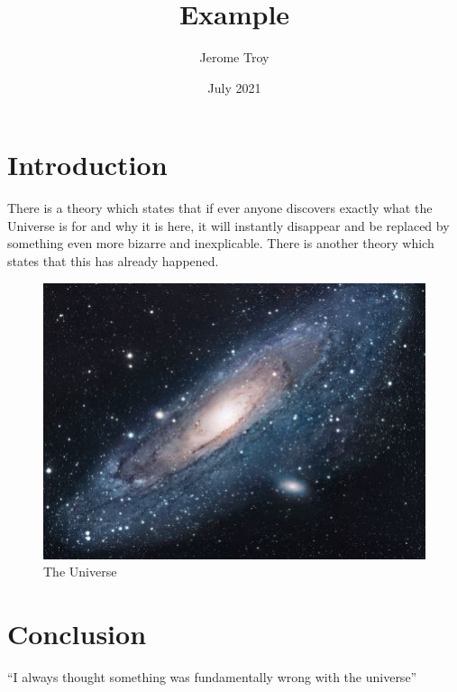 \documentclass{article}
\title{Example}
\author{Jerome Troy}
\date{July 2021}
\begin{document}
\maketitle

\section{Introduction}
There is a theory which states that if ever anyone discovers exactly what the Universe is for and why it is here, it will instantly disappear and be replaced by something even more bizarre and inexplicable.
There is another theory which states that this has already happened.

\begin{figure}[h!]
\centering
\includegraphics[scale=1.7]{universe}
\caption{The Universe}
\label{fig:universe}
\end{figure}

\section{Conclusion}
``I always thought something was fundamentally wrong with the universe'' %

\nocite{*}


\end{document}
